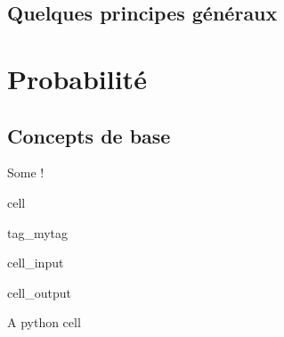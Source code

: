 \documentclass[letterpaper,10pt,english]{jupyterBook}
\begin{document}
\chapter{Quelques principes généraux}
\label{\detokenize{Statistiques_exploratoire/quelques_principes_g_xe9n_xe9raux:quelques-principes-generaux}}\label{\detokenize{Statistiques_exploratoire/quelques_principes_g_xe9n_xe9raux::doc}}
\sphinxstepscope


\part{Probabilité}

\sphinxstepscope


\chapter{Concepts de base}
\label{\detokenize{Probabilit_xe9/concepts_de_base:concepts-de-base}}\label{\detokenize{Probabilit_xe9/concepts_de_base::doc}}
\sphinxAtStartPar
Some !

\begin{sphinxuseclass}{cell}
\begin{sphinxuseclass}{tag_mytag}\begin{sphinxVerbatimInput}

\begin{sphinxuseclass}{cell_input}
\begin{sphinxVerbatim}[commandchars=\\\{\}]
\end{sphinxVerbatim}

\end{sphinxuseclass}\end{sphinxVerbatimInput}
\begin{sphinxVerbatimOutput}

\begin{sphinxuseclass}{cell_output}
\begin{sphinxVerbatim}[commandchars=\\\{\}]
A python cell
\end{sphinxVerbatim}

\end{sphinxuseclass}\end{sphinxVerbatimOutput}

\end{sphinxuseclass}
\end{sphinxuseclass}
\end{document}
